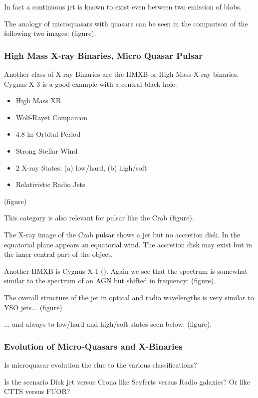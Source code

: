 \documentclass[10pt,a4paper,english]{article}
\begin{document}
In fact a continuous jet is known to exist even between two emission of blobs.

The analogy of microquasars with quasars can be seen in the comparison of the
following two images: (figure).

\subsubsection{High Mass X-ray Binaries, Micro Quasar Pulsar}

Another class of X-ray Binaries are the HMXB or High Mass X-ray binaries.
Cygnus X-3 is a good example with a central black hole:
\begin{itemize}
    \item High Mass XB
    \item Wolf-Rayet Companion
    \item 4.8 hr Orbital Period
    \item Strong Stellar Wind
    \item 2 X-ray States: (a) low/hard, (b) high/soft
    \item Relativistic Radio Jets
\end{itemize}

(figure)

This category is also relevant for pulsar like the Crab (figure).

The X-ray image of the Crab pulsar shows a jet but no accretion disk. In the
equatorial plane appears an equatorial wind. The accretion disk may exist but
in the inner central part of the object.

Another HMXB is Cygnus X-1 (\cite{2005A&A...429..267B}). Again we see that the
spectrum is somewhat similar to the spectrum of an AGN but shifted in
frequency: (figure).

The overall structure of the jet in optical and radio wavelengths is very
similar to YSO jets... (figure)

... and always to low/hard and high/soft states seen below: (figure).

\subsubsection{Evolution of Micro-Quasars and X-Binaries}

Is microquasar evolution the clue to the various classifications?

Is the scenario Disk jet versus Crona like Seyferts versus Radio galaxies? Or
like CTTS versus FUOR?
\end{document}
